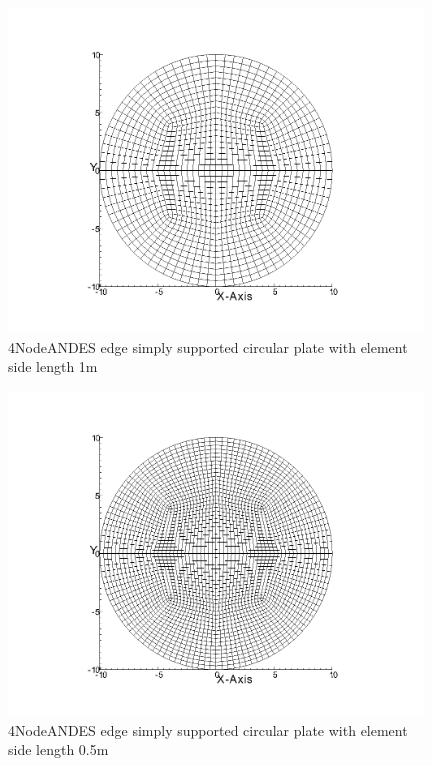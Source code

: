 \documentclass[fleqn,11pt,letter]{article}
\begin{document}
\begin{figure}[H]
  \centering
  \includegraphics[width=11cm]{../Figure_files/4NodeANDES/circular_plate4.png}
  \caption{4NodeANDES edge simply supported circular plate with element side length 1m }
  \label{fig 4NodeANDES edges simply supported circular plate with element side length 1m }
\end{figure}


\begin{figure}[H]
  \centering
  \includegraphics[width=11cm]{../Figure_files/4NodeANDES/circular_plate5.png}
  \caption{4NodeANDES edge simply supported circular plate with element side length 0.5m }
  \label{fig 4NodeANDES edges simply supported circular plate with element side length 0.5m }
\end{figure}

\newpage
\end{document}
